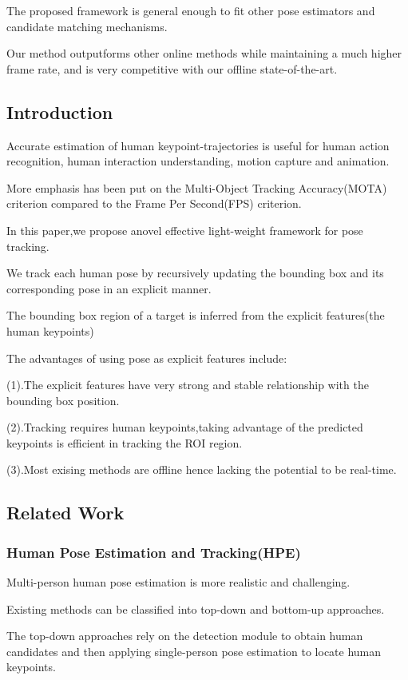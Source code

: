 \documentclass[11pt]{article}
\begin{document}
The proposed framework is general enough to fit other pose estimators and candidate matching mechanisms.

Our method outputforms other online methods while maintaining a much higher frame rate, and is very competitive with our offline state-of-the-art.
\subsection{Introduction}
Accurate estimation of human keypoint-trajectories is useful for human action recognition, human interaction understanding, motion capture and animation.

More emphasis has been put on the Multi-Object Tracking Accuracy(MOTA) criterion compared to the Frame Per Second(FPS) criterion.

In this paper,we propose anovel effective light-weight framework for pose tracking.

We track each human pose by recursively updating the bounding box and its corresponding pose in an explicit manner.

The bounding box region of a target is inferred from the explicit features(the human keypoints)

The advantages of using pose as explicit features include:

(1).The explicit features have very strong and stable relationship with the bounding box position.

(2).Tracking requires human keypoints,taking advantage of the predicted keypoints is efficient in tracking the ROI region.

(3).Most exising methods are offline hence lacking the potential to be real-time.
\subsection{Related Work}
\subsubsection{Human Pose Estimation and Tracking(HPE)}

Multi-person human pose estimation is more realistic and challenging.

Existing methods can be classified into top-down and bottom-up approaches.

The top-down approaches rely on the detection module to obtain human candidates and then applying single-person pose estimation to locate human keypoints.
\end{document}
